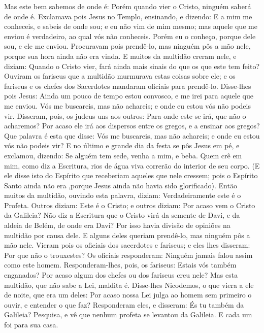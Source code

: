 {Mas este bem sabemos de onde é: Porém quando vier o Cristo, ninguém saberá de onde é.
Exclamava pois Jesus no Templo, ensinando, e dizendo: E a mim me conheceis, e sabeis de onde sou; e eu não vim de mim mesmo; mas aquele que me enviou é verdadeiro, ao qual vós não conheceis.
Porém eu o conheço, porque dele sou, e ele me enviou.
Procuravam pois prendê-lo, mas ninguém pôs a mão nele, porque sua hora ainda não era vinda.
E muitos da multidão creram nele, e diziam: Quando o Cristo vier, fará ainda mais sinais do que os que este tem feito?
Ouviram os fariseus que a multidão murmurava estas coisas sobre ele; e os fariseus e os chefes dos Sacerdotes mandaram oficiais para prendê-lo.
Disse-lhes pois Jesus: Ainda um pouco de tempo estou convosco, e
{} me irei para aquele que me enviou.
Vós me buscareis, mas não
{} achareis; e onde eu estou vós não podeis vir.
Disseram, pois, os judeus uns aos outros: Para onde este se irá, que não o acharemos? Por acaso ele irá aos dispersos entre os gregos, e a ensinar aos gregos?
Que palavra é esta que disse: Vós me buscareis, mas não
{} achareis; e onde eu estou vós não podeis vir?
E no último e grande dia da festa se pôs Jesus em pé, e exclamou, dizendo: Se alguém tem sede, venha a mim, e beba.
Quem crê em mim, como diz a Escritura, rios de água viva correrão do interior de seu corpo.
(E ele disse isto do Espírito que receberiam aqueles que nele cressem; pois o Espírito Santo ainda não era
{} ,porque Jesus ainda não havia sido glorificado).
Então muitos da multidão, ouvindo esta palavra, diziam: Verdadeiramente este é o Profeta.
Outros diziam: Este é o Cristo; e outros diziam: Por acaso vem o Cristo da Galileia?
Não diz a Escritura que o Cristo virá da semente de Davi, e da aldeia de Belém, de onde era Davi?
Por isso havia divisão de opiniões na multidão por causa dele.
E alguns deles queriam prendê-lo, mas ninguém pôs a mão nele.
Vieram pois os oficiais dos sacerdotes e fariseus; e eles lhes disseram: Por que não o trouxestes?
Os oficiais responderam: Ninguém jamais falou assim como este homem.
Responderam-lhes, pois, os fariseus: Estais vós também enganados?
Por acaso algum dos chefes ou dos fariseus creu nele?
Mas esta multidão, que não sabe a Lei, maldita é.
Disse-lhes Nicodemos, o que viera a ele de noite, que era um deles:
Por acaso nossa Lei julga ao homem sem primeiro o ouvir, e entender o que faz?
Responderam eles, e disseram: És tu também da Galileia? Pesquisa, e vê que nenhum profeta se levantou da Galileia.
E cada um foi para sua casa.

}
